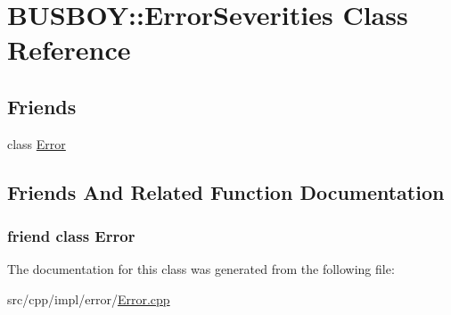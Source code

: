 \hypertarget{classBUSBOY_1_1ErrorSeverities}{
\section{BUSBOY::ErrorSeverities Class Reference}
\label{classBUSBOY_1_1ErrorSeverities}
}
\subsection*{Friends}
\begin{DoxyCompactItemize}
\item 
class \hyperlink{classBUSBOY_1_1ErrorSeverities_a16d3937baa3679c525821223427be40b}{Error}
\end{DoxyCompactItemize}


\subsection{Friends And Related Function Documentation}
\hypertarget{classBUSBOY_1_1ErrorSeverities_a16d3937baa3679c525821223427be40b}{
\subsubsection[{Error}]{\setlength{\rightskip}{0pt plus 5cm}friend class {\bf Error}}}
\label{classBUSBOY_1_1ErrorSeverities_a16d3937baa3679c525821223427be40b}


The documentation for this class was generated from the following file:\begin{DoxyCompactItemize}
\item 
src/cpp/impl/error/\hyperlink{Error_8cpp}{Error.cpp}\end{DoxyCompactItemize}
